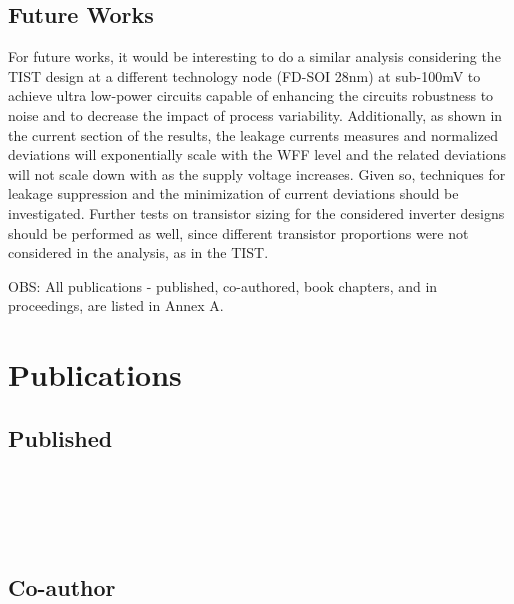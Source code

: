 \documentclass[diss,pgmicro,english]{iiufrgs}
\begin{document}
\section{Future Works}

For future works, it would be interesting to do a similar analysis  considering the TIST design at a different technology node (FD-SOI 28nm) at sub-100mV to achieve ultra low-power circuits capable of enhancing the circuits robustness to noise and to decrease the impact of process variability. Additionally, as shown in the current section of the results, the leakage currents measures and normalized deviations will exponentially scale with the WFF level and the related deviations will not scale down with as the supply voltage increases. Given so, techniques for leakage suppression and the minimization of current deviations should be investigated. Further tests on transistor sizing for the considered inverter designs should be performed as well, since different transistor proportions were not considered in the analysis, as in the TIST.


\vspace{1cm}
OBS: All publications - published, co-authored, book chapters, and in proceedings, are listed in Annex A.





\annex
\chapter{Publications}

\section{Published}
\nobibliography*

\begin{sloppypar}
 \\
\end{sloppypar}

 \\


 \\

\section{Co-author}

\end{document}
